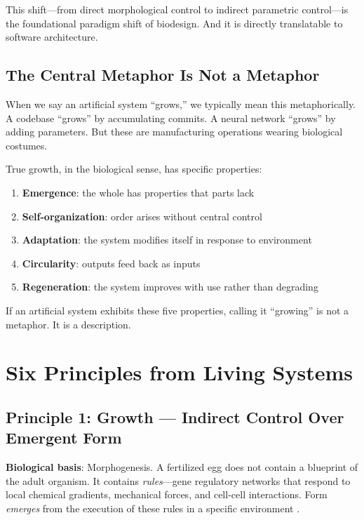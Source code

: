 \documentclass[11pt,a4paper]{article}
\begin{document}
This shift---from direct morphological control to indirect parametric control---is the foundational paradigm shift of biodesign. And it is directly translatable to software architecture.

\subsection{The Central Metaphor Is Not a Metaphor}

When we say an artificial system ``grows,'' we typically mean this metaphorically. A codebase ``grows'' by accumulating commits. A neural network ``grows'' by adding parameters. But these are manufacturing operations wearing biological costumes.

True growth, in the biological sense, has specific properties:
\begin{enumerate}
  \item \textbf{Emergence}: the whole has properties that parts lack \citep{anderson1972}
  \item \textbf{Self-organization}: order arises without central control \citep{kauffman1993}
  \item \textbf{Adaptation}: the system modifies itself in response to environment
  \item \textbf{Circularity}: outputs feed back as inputs \citep{braungart2002}
  \item \textbf{Regeneration}: the system improves with use rather than degrading
\end{enumerate}

If an artificial system exhibits these five properties, calling it ``growing'' is not a metaphor. It is a description.

\section{Six Principles from Living Systems}

\subsection{Principle 1: Growth --- Indirect Control Over Emergent Form}

\textbf{Biological basis}: Morphogenesis. A fertilized egg does not contain a blueprint of the adult organism. It contains \emph{rules}---gene regulatory networks that respond to local chemical gradients, mechanical forces, and cell-cell interactions. Form \emph{emerges} from the execution of these rules in a specific environment \citep{turing1952,wolpert1969}.
\end{document}
